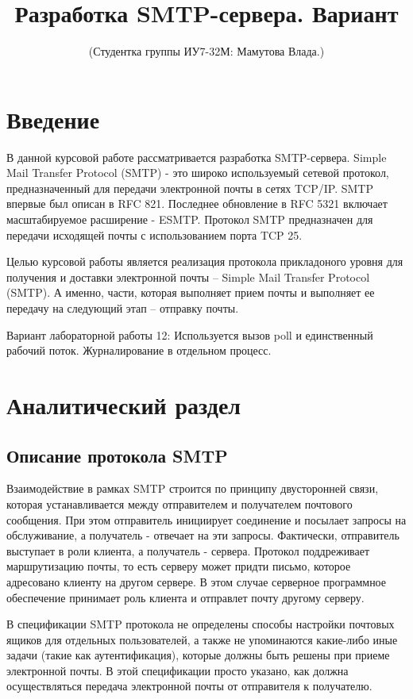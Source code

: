 \documentclass[a4paper,12pt]{report}
\title{Разработка SMTP-сервера. Вариант \textnumero 12}
\author{(Студентка группы ИУ7-32М: Мамутова Влада.)}
\begin{document}
	\maketitle
	\tableofcontents

	\chapter*{Введение}
	В данной курсовой работе рассматривается разработка SMTP-сервера. Simple Mail Transfer Protocol (SMTP) - это широко используемый сетевой протокол, предназначенный для передачи электронной почты в сетях TCP/IP. SMTP впервые был описан в RFC 821. Последнее обновление в RFC 5321 включает масштабируемое расширение - ESMTP. Протокол SMTP предназначен для передачи исходящей почты с использованием порта TCP 25.

	Целью курсовой работы является реализация протокола прикладоного уровня для получения и доставки электронной почты --
	 Simple Mail Transfer Protocol (SMTP).
	  А именно, части, которая выполняет прием почты и выполняет ее передачу на следующий этап -- отправку почты. 

	Вариант лабораторной работы 12:  Используется вызов poll и единственный рабочий поток. Журналирование в отдельном процесс.


	\chapter{Аналитический раздел}

	\section{Описание протокола SMTP}

	 Взаимодействие в рамках SMTP строится по принципу двусторонней связи, которая устанавливается между отправителем и получателем почтового сообщения. При этом отправитель инициирует соединение и посылает запросы на обслуживание, а получатель - отвечает на эти запросы. Фактически, отправитель выступает в роли клиента, а получатель - сервера. Протокол поддреживает маршрутизацию почты, то есть серверу может придти письмо, которое адресовано клиенту на другом сервере. В этом случае серверное программное обеспечение принимает роль клиента и отправлет почту другому серверу. 
	 
	 В спецификации SMTP протокола не определены способы настройки почтовых ящиков для отдельных пользователей, а также не упоминаются какие-либо иные задачи (такие как аутентификация), которые должны быть решены при приеме электронной почты. В этой спецификации просто указано, как должна осуществляться передача электронной почты от отправителя к получателю.
\end{document}
